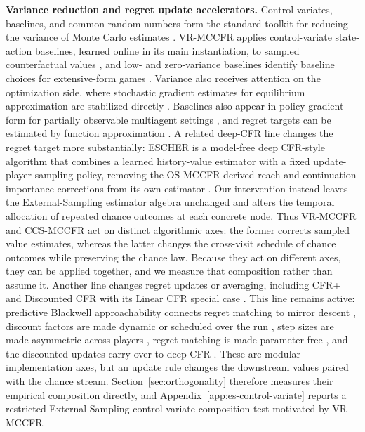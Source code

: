 \documentclass[11pt]{article}
\begin{document}
\textbf{Variance reduction and regret update accelerators.} Control variates, baselines, and common random numbers form the standard toolkit for reducing the variance of Monte Carlo estimates \citep{mohamed2020monte}. VR-MCCFR applies control-variate state-action baselines, learned online in its main instantiation, to sampled counterfactual values \citep{schmid2019variance}, and low- and zero-variance baselines identify baseline choices for extensive-form games \citep{davis2020low}. Variance also receives attention on the optimization side, where stochastic gradient estimates for equilibrium approximation are stabilized directly \citep{meng2025reducing}. Baselines also appear in policy-gradient form for partially observable multiagent settings \citep{srinivasan2018actor}, and regret targets can be estimated by function approximation \citep{waugh2015solving}. A related deep-CFR line \citep{brown2019deep,steinberger2020dream,brown2020combining} changes the regret target more substantially: ESCHER is a model-free deep CFR-style algorithm that combines a learned history-value estimator with a fixed update-player sampling policy, removing the OS-MCCFR-derived reach and continuation importance corrections from its own estimator \citep{mcaleer2023escher}. Our intervention instead leaves the External-Sampling estimator algebra unchanged and alters the temporal allocation of repeated chance outcomes at each concrete node. Thus VR-MCCFR and CCS-MCCFR act on distinct algorithmic axes: the former corrects sampled value estimates, whereas the latter changes the cross-visit schedule of chance outcomes while preserving the chance law. Because they act on different axes, they can be applied together, and we measure that composition rather than assume it. Another line changes regret updates or averaging, including CFR+ \citep{tammelin2014solving} and Discounted CFR with its Linear CFR special case \citep{brown2019solving}. This line remains active: predictive Blackwell approachability connects regret matching to mirror descent \citep{farina2021faster}, discount factors are made dynamic \citep{xu2024dynamic} or scheduled over the run \citep{zhang2026faster}, step sizes are made asymmetric across players \citep{meng2026faster}, regret matching is made parameter-free \citep{meng2026parameterfree}, and the discounted updates carry over to deep CFR \citep{xu2026deep}. These are modular implementation axes, but an update rule changes the downstream values paired with the chance stream. Section~\ref{sec:orthogonality} therefore measures their empirical composition directly, and Appendix~\ref{app:es-control-variate} reports a restricted External-Sampling control-variate composition test motivated by VR-MCCFR.
\end{document}
